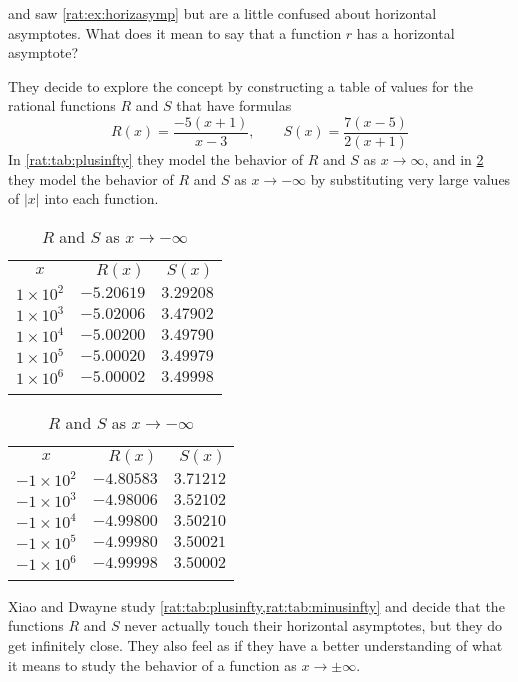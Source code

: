 \begin{pccexample}
 and  saw \cref{rat:ex:horizasymp} but are a little confused 
about horizontal asymptotes. What does it mean to say that a function $r$ has a horizontal
asymptote? 

They decide to explore the concept by 
constructing a table of values for the rational functions $R$ and  $S$ that have formulas
\[
	R(x)=\frac{-5(x+1)}{x-3}, \qquad S(x)=\frac{7(x-5)}{2(x+1)}
\]
In \cref{rat:tab:plusinfty} they model the behavior of $R$ and $S$ as $x\rightarrow\infty$, 
and in \cref{rat:tab:minusinfty} they model the behavior of $R$ and $S$ as $x\rightarrow-\infty$
by substituting very large values of $|x|$ into each function.
\begin{table}[!htb]
	\begin{minipage}{.5\textwidth}
		\centering
		\caption{$R$ and $S$ as $x\rightarrow\infty$}
		\label{rat:tab:plusinfty}
		\begin{tabular}{crr}
			\beforeheading
			$x$            & $R(x)$     & $S(x)$    \\ \afterheading
			$1\times 10^2$ & $-5.20619$ & $3.29208$ \\\normalline
			$1\times 10^3$ & $-5.02006$ & $3.47902$ \\\normalline
			$1\times 10^4$ & $-5.00200$ & $3.49790$ \\\normalline
			$1\times 10^5$ & $-5.00020$ & $3.49979$ \\\normalline
			$1\times 10^6$ & $-5.00002$ & $3.49998$ \\\lastline
		\end{tabular}
	\end{minipage}%
	\begin{minipage}{.5\textwidth}
		\centering
		\caption{$R$ and $S$ as $x\rightarrow-\infty$}
		\label{rat:tab:minusinfty}
		\begin{tabular}{crr}
			\beforeheading
			$x$             & $R(x)$     & $S(x)$    \\ \afterheading
			$-1\times 10^2$ & $-4.80583$ & $3.71212$ \\\normalline
			$-1\times 10^3$ & $-4.98006$ & $3.52102$ \\\normalline
			$-1\times 10^4$ & $-4.99800$ & $3.50210$ \\\normalline
			$-1\times 10^5$ & $-4.99980$ & $3.50021$ \\\normalline
			$-1\times 10^6$ & $-4.99998$ & $3.50002$ \\\lastline
		\end{tabular}
	\end{minipage}
\end{table}

Xiao and Dwayne study \cref{rat:tab:plusinfty,rat:tab:minusinfty} and decide that 
the functions $R$ and $S$ never actually touch their horizontal asymptotes, but they 
do get infinitely close. They also feel as if they have a better understanding of 
what it means to study the behavior of a function as $x\rightarrow\pm\infty$.
\end{pccexample}

